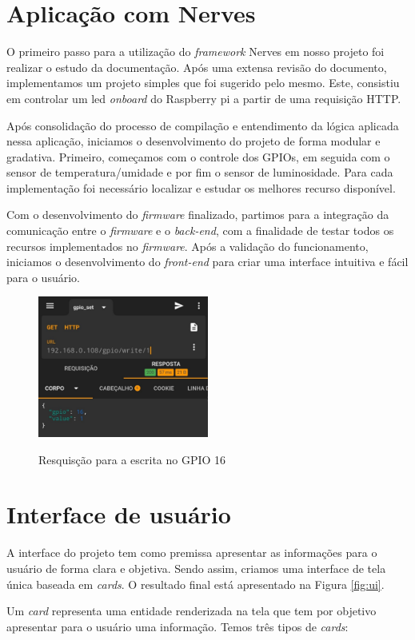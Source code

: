 \documentclass[../../layout.tex]{subfiles}
\begin{document}
\section{Aplicação com Nerves}
O primeiro passo para a utilização do \emph{framework} Nerves em nosso projeto foi realizar o estudo da documentação. Após uma extensa revisão do documento, implementamos um projeto simples que foi sugerido pelo mesmo. Este, consistiu em controlar um led \emph{onboard} do Raspberry pi a partir de uma requisição HTTP.\par
Após consolidação do processo de compilação e entendimento da lógica aplicada nessa aplicação, iniciamos o desenvolvimento do projeto de forma modular e gradativa. Primeiro, começamos com o controle dos GPIOs, em seguida com o sensor de temperatura/umidade e por fim o sensor de luminosidade. Para cada implementação foi necessário localizar e estudar os melhores recurso disponível.\par
Com o desenvolvimento do \emph{firmware} finalizado, partimos para a integração da comunicação entre o \emph{firmware} e o \emph{back-end}, com a finalidade de testar todos os recursos implementados no \emph{firmware}. Após a validação do funcionamento, iniciamos o desenvolvimento do \emph{front-end} para criar uma interface intuitiva e fácil para o usuário.

\begin{figure}[H]
\centering
\caption{Resquisção para a escrita no GPIO 16}
\includegraphics[width=0.5\textwidth]{assets/static/img/request.jpg}
\label{fig:request_gpio}

\begin{minipage}{0.5\textwidth}
\end{minipage}
\end{figure}

\section{Interface de usuário}
A interface do projeto tem como premissa apresentar as informações para o usuário de forma clara e objetiva. Sendo assim, criamos uma interface de tela única baseada em \emph{cards}. O resultado final está apresentado na Figura \ref{fig:ui}.\par
Um \emph{card} representa uma entidade renderizada na tela que tem por objetivo apresentar para o usuário uma informação. Temos três tipos de \emph{cards}:
\end{document}
